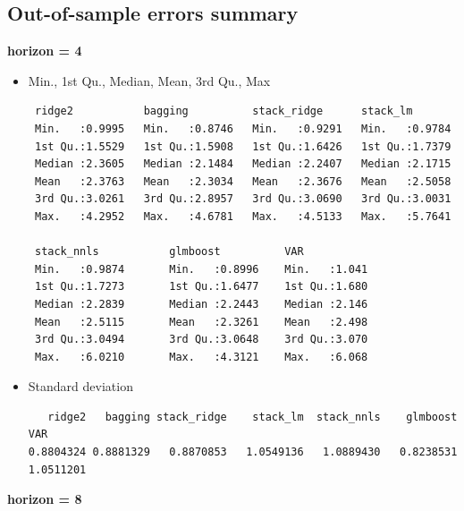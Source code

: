 \subsection{Out-of-sample errors summary}
\label{boxplot_summary}

\textbf{horizon = 4}

\begin{itemize}

\item Min., 1st Qu., Median, Mean, 3rd Qu., Max

\begin{verbatim}
 ridge2           bagging          stack_ridge      stack_lm         
 Min.   :0.9995   Min.   :0.8746   Min.   :0.9291   Min.   :0.9784   
 1st Qu.:1.5529   1st Qu.:1.5908   1st Qu.:1.6426   1st Qu.:1.7379   
 Median :2.3605   Median :2.1484   Median :2.2407   Median :2.1715      
 Mean   :2.3763   Mean   :2.3034   Mean   :2.3676   Mean   :2.5058      
 3rd Qu.:3.0261   3rd Qu.:2.8957   3rd Qu.:3.0690   3rd Qu.:3.0031      
 Max.   :4.2952   Max.   :4.6781   Max.   :4.5133   Max.   :5.7641
 
 stack_nnls           glmboost          VAR
 Min.   :0.9874       Min.   :0.8996    Min.   :1.041 
 1st Qu.:1.7273       1st Qu.:1.6477    1st Qu.:1.680
 Median :2.2839       Median :2.2443    Median :2.146
 Mean   :2.5115       Mean   :2.3261    Mean   :2.498
 3rd Qu.:3.0494       3rd Qu.:3.0648    3rd Qu.:3.070
 Max.   :6.0210       Max.   :4.3121    Max.   :6.068
\end{verbatim}

\item Standard deviation

\begin{verbatim}
   ridge2   bagging stack_ridge    stack_lm  stack_nnls    glmboost   VAR
0.8804324 0.8881329   0.8870853   1.0549136   1.0889430   0.8238531   1.0511201
\end{verbatim}

\end{itemize}

\textbf{horizon = 8}

